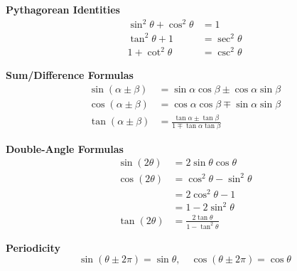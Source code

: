 \documentclass[11pt, a4paper, oneside]{article}
\begin{document}
\begin{minipage}[t]{0.48\textwidth}
\textbf{Pythagorean Identities}
\begin{align*}
\sin^2\theta + \cos^2\theta &= 1 \\
\tan^2\theta + 1 &= \sec^2\theta \\
1 + \cot^2\theta &= \csc^2\theta
\end{align*}
\vspace{2ex}

\textbf{Sum/Difference Formulas}
\begin{align*}
\sin(\alpha \pm \beta) &= \sin\alpha \cos\beta \pm \cos\alpha \sin\beta \\
\cos(\alpha \pm \beta) &= \cos\alpha \cos\beta \mp \sin\alpha \sin\beta \\
\tan(\alpha \pm \beta) &= \frac{\tan\alpha \pm \tan\beta}{1 \mp \tan\alpha \tan\beta}
\end{align*}
\vspace{2ex}

\textbf{Double-Angle Formulas}
\begin{align*}
\sin(2\theta) &= 2\sin\theta \cos\theta \\
\cos(2\theta) &= \cos^2\theta - \sin^2\theta \\
              &= 2\cos^2\theta - 1 \\
              &= 1 - 2\sin^2\theta \\
\tan(2\theta) &= \frac{2\tan\theta}{1 - \tan^2\theta}
\end{align*}
\vspace{2ex}

\textbf{Periodicity}
\[
\sin(\theta \pm 2\pi) = \sin\theta,\quad 
\cos(\theta \pm 2\pi) = \cos\theta %
\]
\end{minipage}
\hfill
\end{document}
